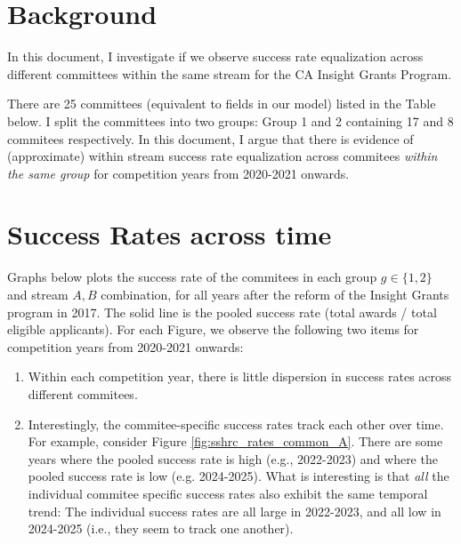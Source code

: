 \documentclass[11pt,reqno]{amsart}
\theoremstyle{definition}
\begin{document}
\tableofcontents

\newpage
\section{Background}

\noindent In this document, I investigate if we observe success rate equalization across different committees within the same stream for the CA Insight Grants Program. 

\noindent There are 25 committees (equivalent to fields in our model) listed in the Table below. I split the committees into two groups: Group 1 and 2 containing 17 and 8 commitees respectively. In this document, I argue that there is evidence of (approximate) within stream success rate equalization across commitees \textit{within the same group} for competition years from 2020-2021 onwards. 


\begin{table}
\centering
\small

\caption{\footnotesize SSHRC Insight Grant merit review committees by group, with Multidisciplinary social sciences (23) split into 23A and 23B from 2022--23 and Indigenous research (21) and the Tri-Agency interdisciplinary committee (24) in neither group.}
\label{tab:sshrc_committees}
\end{table}

\newpage
{}

\section{Success Rates across time}

\noindent Graphs below plots the success rate of the commitees in each group $g\in \{1,2\}$ and stream $A,B$ combination, for all years after the reform of the Insight Grants program in 2017. The solid line is the pooled success rate (total awards / total eligible applicants). For each Figure, we observe the following two items for competition years from 2020-2021 onwards:
\begin{enumerate}[label=(\arabic*),ref=\thelemma(\arabic*)]
  \item Within each competition year, there is little dispersion in success rates across different commitees. 
  \item Interestingly, the commitee-specific success rates track each other over time. For example, consider Figure \ref{fig:sshrc_rates_common_A}. There are some years where the pooled success rate is high (e.g., 2022-2023) and where the pooled success rate is low (e.g. 2024-2025). What is interesting is that \textit{all} the individual commitee specific success rates also exhibit the same temporal trend: The individual success rates are all large in 2022-2023, and all low in 2024-2025 (i.e., they seem to track one another). 
\end{enumerate}
\end{document}
